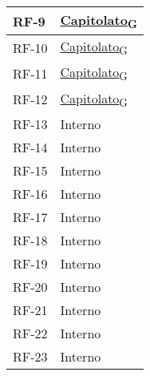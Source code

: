 \begin{longtable}{|>{\centering\arraybackslash}m{}|>{\centering\arraybackslash}m{}|}
	RF-9            & \href{https://7last.github.io/docs/rtb/documentazione-interna/glossario\#capitolato}{Capitolato\textsubscript{G}} \\\hline
	RF-10           & \href{https://7last.github.io/docs/rtb/documentazione-interna/glossario\#capitolato}{Capitolato\textsubscript{G}} \\\hline
	RF-11           & \href{https://7last.github.io/docs/rtb/documentazione-interna/glossario\#capitolato}{Capitolato\textsubscript{G}} \\\hline
	RF-12           & \href{https://7last.github.io/docs/rtb/documentazione-interna/glossario\#capitolato}{Capitolato\textsubscript{G}} \\\hline
	RF-13           & Interno                                                                                                           \\\hline
	RF-14           & Interno                                                                                                           \\\hline
	RF-15           & Interno                                                                                                           \\\hline
	RF-16           & Interno                                                                                                           \\\hline
	RF-17           & Interno                                                                                                           \\\hline
	RF-18           & Interno                                                                                                           \\\hline
	RF-19           & Interno                                                                                                           \\\hline
	RF-20           & Interno                                                                                                           \\\hline
	RF-21           & Interno                                                                                                           \\\hline
	RF-22           & Interno                                                                                                           \\\hline
	RF-23           & Interno                                                                                                           \\\hline

\end{longtable}
